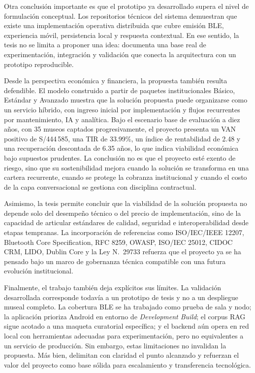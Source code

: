 Otra conclusión importante es que el prototipo ya desarrollado supera el nivel de formulación conceptual. Los repositorios técnicos del sistema demuestran que existe una implementación operativa distribuida que cubre emisión BLE, experiencia móvil, persistencia local y respuesta contextual. En ese sentido, la tesis no se limita a proponer una idea: documenta una base real de experimentación, integración y validación que conecta la arquitectura con un prototipo reproducible.

Desde la perspectiva económica y financiera, la propuesta también resulta defendible. El modelo construido a partir de paquetes institucionales Básico, Estándar y Avanzado muestra que la solución propuesta puede organizarse como un servicio híbrido, con ingreso inicial por implementación y flujos recurrentes por mantenimiento, IA y analítica. Bajo el escenario base de evaluación a diez años, con 35 museos captados progresivamente, el proyecto presenta un VAN positivo de S/444\,585, una TIR de 33.99\%, un índice de rentabilidad de 2.48 y una recuperación descontada de 6.35 años, lo que indica viabilidad económica bajo supuestos prudentes. La conclusión no es que el proyecto esté exento de riesgo, sino que su sostenibilidad mejora cuando la solución se transforma en una cartera recurrente, cuando se protege la cobranza institucional y cuando el costo de la capa conversacional se gestiona con disciplina contractual.

Asimismo, la tesis permite concluir que la viabilidad de la solución propuesta no depende solo del desempeño técnico o del precio de implementación, sino de la capacidad de articular estándares de calidad, seguridad e interoperabilidad desde etapas tempranas. La incorporación de referencias como ISO/IEC/IEEE 12207, Bluetooth Core Specification, RFC 8259, OWASP, ISO/IEC 25012, CIDOC CRM, LIDO, Dublin Core y la Ley N.\ 29733 refuerza que el proyecto ya se ha pensado bajo un marco de gobernanza técnica compatible con una futura evolución institucional.

Finalmente, el trabajo también deja explícitos sus límites. La validación desarrollada corresponde todavía a un prototipo de tesis y no a un despliegue museal completo. La cobertura BLE se ha trabajado como prueba de sala y nodo; la aplicación prioriza Android en entorno de \textit{Development Build}; el corpus RAG sigue acotado a una maqueta curatorial específica; y el backend aún opera en red local con herramientas adecuadas para experimentación, pero no equivalentes a un servicio de producción. Sin embargo, estas limitaciones no invalidan la propuesta. Más bien, delimitan con claridad el punto alcanzado y refuerzan el valor del proyecto como base sólida para escalamiento y transferencia tecnológica.

